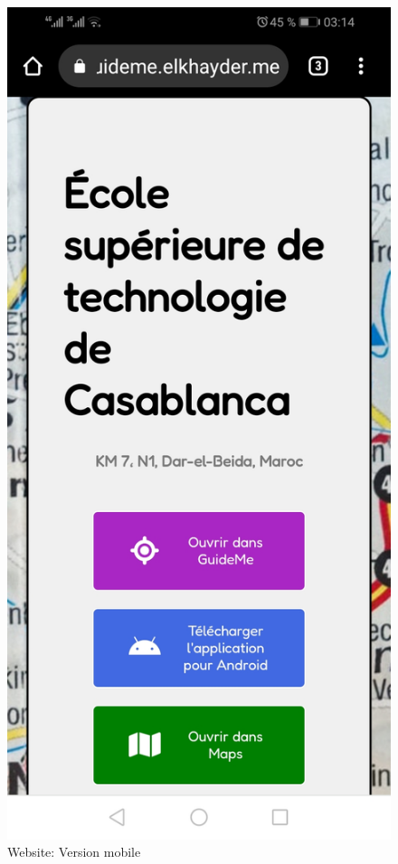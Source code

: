\begin{figure}[!htbp]
    \centering
    \includegraphics[height=.8\textheight]{assets/website/mobile.jpg}
    \caption{Website: Version mobile}
\end{figure}


